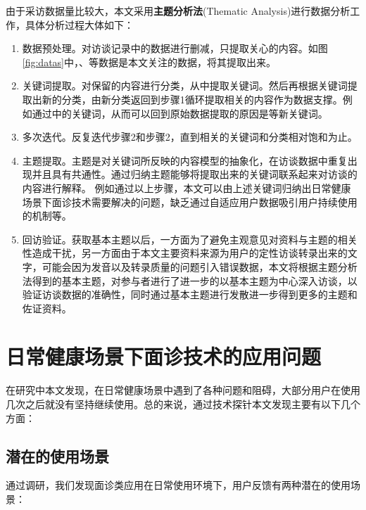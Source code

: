 由于采访数据量比较大，本文采用\textbf{主题分析法}(Thematic Analysis)进行数据分析工作，具体分析过程大体如下：
\begin{enumerate}
    \item 数据预处理。对访谈记录中的数据进行删减，只提取关心的内容。如图\ref{fig:datas}中，、等数据是本文关注的数据，将其提取出来。

    \item 关键词提取。对保留的内容进行分类，从中提取关键词。然后再根据关键词提取出新的分类，由新分类返回到步骤1循环提取相关的内容作为数据支撑。例如通过中的关键词，从而可以回到原始数据提取的原因是等新关键词。
    
    \item 多次迭代。反复迭代步骤2和步骤2，直到相关的关键词和分类相对饱和为止。

    \item 主题提取。主题是对关键词所反映的内容模型的抽象化，在访谈数据中重复出现并且具有共通性。通过归纳主题能够将提取出来的关键词联系起来对访谈的内容进行解释。
    例如通过以上步骤，本文可以由上述关键词归纳出日常健康场景下面诊技术需要解决的问题，缺乏通过自适应用户数据吸引用户持续使用的机制等。

    \item 回访验证。获取基本主题以后，一方面为了避免主观意见对资料与主题的相关性造成干扰，另一方面由于本文主要资料来源为用户的定性访谈转录出来的文字，可能会因为发音以及转录质量的问题引入错误数据，本文将根据主题分析法得到的基本主题，对参与者进行了进一步的以基本主题为中心深入访谈，以验证访谈数据的准确性，同时通过基本主题进行发散进一步得到更多的主题和佐证资料。
\end{enumerate}


\section{日常健康场景下面诊技术的应用问题}

在研究中本文发现，在日常健康场景中遇到了各种问题和阻碍，大部分用户在使用几次之后就没有坚持继续使用。总的来说，通过技术探针本文发现主要有以下几个方面：

\subsection{潜在的使用场景}
通过调研，我们发现面诊类应用在日常使用环境下，用户反馈有两种潜在的使用场景：

